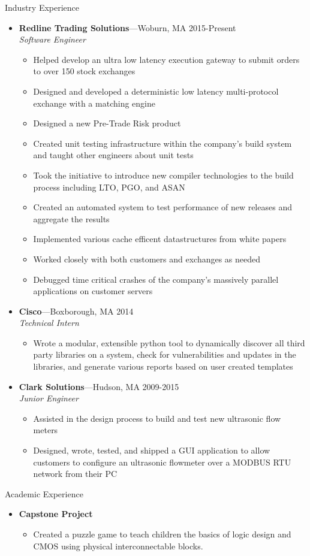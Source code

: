 \documentclass[10pt,oneside]{article}
\newenvironment{ressection}[1]{
	\vspace{4pt}
	{\fontfamily{phv}\selectfont\Large#1}
	\begin{itemize}
	\vspace{3pt}
}{
	\end{itemize}
}
\newcommand{\resitem}[1]{
	\vspace{-4pt}
	\item \begin{flushleft} #1 \end{flushleft}
}
\newcommand{\ressubitem}[1]{
	\vspace{-1pt}
	\item \begin{flushleft} #1 \end{flushleft}
}
\newcommand{\resbigitem}[3]{
	\vspace{-5pt}
	\item
	\textbf{#1}---#2 \\
	\textit{#3}
}
\newenvironment{ressubsec}[3]{
	\resbigitem{#1}{#2}{#3}
	\vspace{-2pt}
	\begin{itemize}
}{
	\end{itemize}
}
\newenvironment{reslist}[1]{
	\resitem{\textbf{#1}}
	\vspace{-5pt}
	\begin{itemize}
}{
	\end{itemize}
}
\begin{document}
\begin{ressection}{Industry Experience}

\begin{ressubsec}{Redline Trading Solutions}{Woburn, MA \hfill 2015-Present}
{Software Engineer}
\ressubitem{Helped develop an ultra low latency execution gateway to submit orders to over 150 stock exchanges}
\ressubitem{Designed and developed a deterministic low latency multi-protocol exchange with a matching engine}
\ressubitem{Designed a new Pre-Trade Risk product}
\ressubitem{Created unit testing infrastructure within the company's build system and taught other engineers about unit tests}
\ressubitem{Took the initiative to introduce new compiler technologies to the build process including LTO, PGO, and ASAN}
\ressubitem{Created an automated system to test performance of new releases and aggregate the results}
\ressubitem{Implemented various cache efficent datastructures from white papers}
\ressubitem{Worked closely with both customers and exchanges as needed}
\ressubitem{Debugged time critical crashes of the company's massively parallel applications on customer servers}
\end{ressubsec}

\begin{ressubsec}{Cisco}{Boxborough, MA \hfill 2014}
{Technical Intern}
\ressubitem{Wrote a modular, extensible python tool to dynamically discover all third party libraries on a system, check for vulnerabilities and updates in the libraries, and generate various reports based on user created templates}
\end{ressubsec}

\begin{ressubsec}{Clark Solutions}{Hudson, MA \hfill 2009-2015}
{Junior Engineer}
\ressubitem{Assisted in the design process to build and test new ultrasonic flow meters}
\ressubitem{Designed, wrote, tested, and shipped a GUI application to allow customers to configure an ultrasonic flowmeter over a MODBUS RTU network from their PC}
\end{ressubsec}

\end{ressection}

\begin{ressection}{Academic Experience}

\begin{reslist}{Capstone Project}
\ressubitem{Created a puzzle game to teach children the basics of logic design and CMOS using physical interconnectable blocks.}
\end{reslist}

\end{ressection}
\end{document}
